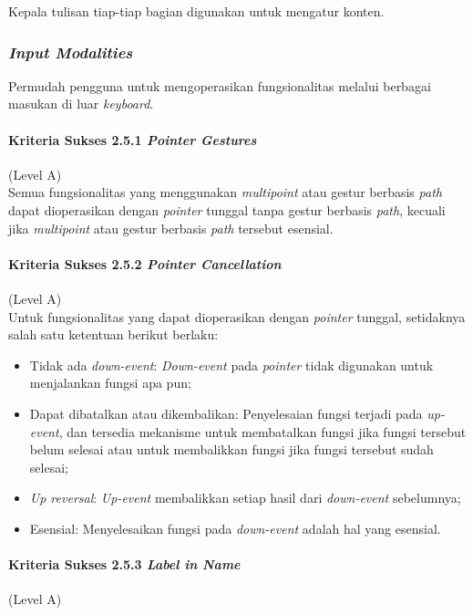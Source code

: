 Kepala tulisan tiap-tiap bagian digunakan untuk mengatur konten.

\subsubsection{\textit{Input Modalities}}
\label{sec:input_modalities}
Permudah pengguna untuk mengoperasikan fungsionalitas melalui berbagai masukan di luar \textit{keyboard}.

\paragraph{Kriteria Sukses 2.5.1 \textit{Pointer Gestures}}
\label{sec:kriteria_sukses_2.5.1}
(Level A)\\

Semua fungsionalitas yang menggunakan \textit{multipoint} atau gestur berbasis \textit{path} dapat dioperasikan dengan \textit{pointer} tunggal tanpa gestur berbasis \textit{path}, kecuali jika \textit{multipoint} atau gestur berbasis \textit{path} tersebut esensial.

\paragraph{Kriteria Sukses 2.5.2 \textit{Pointer Cancellation}}
\label{sec:kriteria_sukses_2.5.2}
(Level A)\\

Untuk fungsionalitas yang dapat dioperasikan dengan \textit{pointer} tunggal, setidaknya salah satu ketentuan berikut berlaku:
\begin{itemize}
	\item Tidak ada \textit{down-event}: \textit{Down-event} pada \textit{pointer} tidak digunakan untuk menjalankan fungsi apa pun;
	\item Dapat dibatalkan atau dikembalikan: Penyelesaian fungsi terjadi pada \textit{up-event}, dan tersedia mekanisme untuk membatalkan fungsi jika fungsi tersebut belum selesai atau untuk membalikkan fungsi jika fungsi tersebut sudah selesai;
	\item \textit{Up reversal}: \textit{Up-event} membalikkan setiap hasil dari \textit{down-event} sebelumnya;
	\item Esensial: Menyelesaikan fungsi pada \textit{down-event} adalah hal yang esensial.
\end{itemize}

\paragraph{Kriteria Sukses 2.5.3 \textit{Label in Name}}
\label{sec:kriteria_sukses_2.5.3}
(Level A)\\

